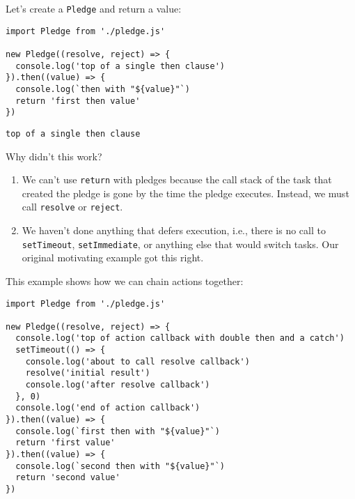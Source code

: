 \documentclass[krantzl]{krantz}
\begin{document}
Let's create a \texttt{Pledge} and return a value:


\begin{lstlisting}[frame=single,frameround=tttt]
import Pledge from './pledge.js'

new Pledge((resolve, reject) => {
  console.log('top of a single then clause')
}).then((value) => {
  console.log(`then with "${value}"`)
  return 'first then value'
})
\end{lstlisting}



\begin{lstlisting}[frame=single,frameround=tttt]
top of a single then clause
\end{lstlisting}



\noindent Why didn't this work?

\begin{enumerate}

\item 

We can't use \texttt{return} with pledges
    because the call stack of the task that created the pledge is gone
    by the time the pledge executes.
    Instead, we must call \texttt{resolve} or \texttt{reject}.



\item 

We haven't done anything that defers execution,
    i.e.,
    there is no call to \texttt{setTimeout}, \texttt{setImmediate},
    or anything else that would switch tasks.
    Our original motivating example got this right.



\end{enumerate}


This example shows how we can chain actions together:


\begin{lstlisting}[frame=single,frameround=tttt]
import Pledge from './pledge.js'

new Pledge((resolve, reject) => {
  console.log('top of action callback with double then and a catch')
  setTimeout(() => {
    console.log('about to call resolve callback')
    resolve('initial result')
    console.log('after resolve callback')
  }, 0)
  console.log('end of action callback')
}).then((value) => {
  console.log(`first then with "${value}"`)
  return 'first value'
}).then((value) => {
  console.log(`second then with "${value}"`)
  return 'second value'
})
\end{lstlisting}
\end{document}
